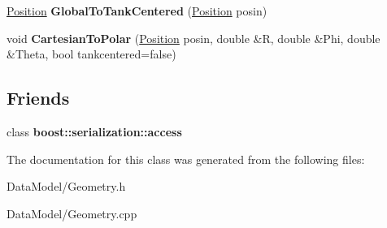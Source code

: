 \begin{DoxyCompactItemize}
\item 
\hypertarget{classGeometry_af1ef26f91bb256a2a7d52c37f502acc7}{\hyperlink{classPosition}{Position} {\bfseries Global\-To\-Tank\-Centered} (\hyperlink{classPosition}{Position} posin)}\label{classGeometry_af1ef26f91bb256a2a7d52c37f502acc7}

\item 
\hypertarget{classGeometry_a89335cdbf640744d7e4362d8495b6859}{void {\bfseries Cartesian\-To\-Polar} (\hyperlink{classPosition}{Position} posin, double \&R, double \&Phi, double \&Theta, bool tankcentered=false)}\label{classGeometry_a89335cdbf640744d7e4362d8495b6859}

\end{DoxyCompactItemize}
\subsection*{Friends}
\begin{DoxyCompactItemize}
\item 
\hypertarget{classGeometry_ac98d07dd8f7b70e16ccb9a01abf56b9c}{class {\bfseries boost\-::serialization\-::access}}\label{classGeometry_ac98d07dd8f7b70e16ccb9a01abf56b9c}

\end{DoxyCompactItemize}


The documentation for this class was generated from the following files\-:\begin{DoxyCompactItemize}
\item 
Data\-Model/Geometry.\-h\item 
Data\-Model/Geometry.\-cpp\end{DoxyCompactItemize}
